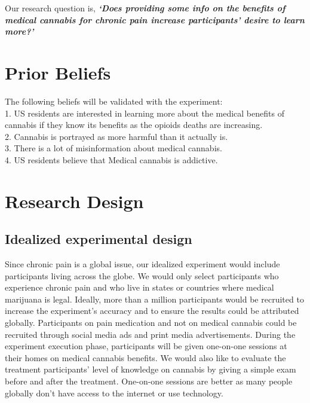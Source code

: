 \documentclass[
]{article}
\begin{document}
Our research question is, \textbf{\emph{`Does providing some info on the
benefits of medical cannabis for chronic pain increase participants'
desire to learn more?'}}

\hypertarget{prior-beliefs}{%
\section{Prior Beliefs}\label{prior-beliefs}}

The following beliefs will be validated with the experiment:\\
1. US residents are interested in learning more about the medical
benefits of cannabis if they know its benefits as the opioids deaths are
increasing.\\
2. Cannabis is portrayed as more harmful than it actually is.\\
3. There is a lot of misinformation about medical cannabis.\\
4. US residents believe that Medical cannabis is addictive.

\hypertarget{research-design}{%
\section{Research Design}\label{research-design}}

\hypertarget{idealized-experimental-design}{%
\subsection{Idealized experimental
design}\label{idealized-experimental-design}}

Since chronic pain is a global issue, our idealized experiment would
include participants living across the globe. We would only select
participants who experience chronic pain and who live in states or
countries where medical marijuana is legal. Ideally, more than a million
participants would be recruited to increase the experiment's accuracy
and to ensure the results could be attributed globally. Participants on
pain medication and not on medical cannabis could be recruited through
social media ads and print media advertisements. During the experiment
execution phase, participants will be given one-on-one sessions at their
homes on medical cannabis benefits. We would also like to evaluate the
treatment participants' level of knowledge on cannabis by giving a
simple exam before and after the treatment. One-on-one sessions are
better as many people globally don't have access to the internet or use
technology.
\end{document}
